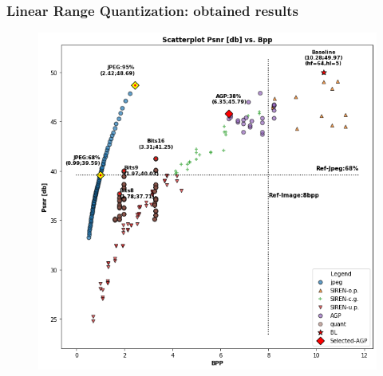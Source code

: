 



\begin{frame}
\frametitle{Linear Range Quantization: obtained results}

\begin{figure}
\includegraphics[scale=0.40]{slides/experiments/quant_dataset/tmp_scatterplot_quant.png}
\end{figure}

\end{frame}

